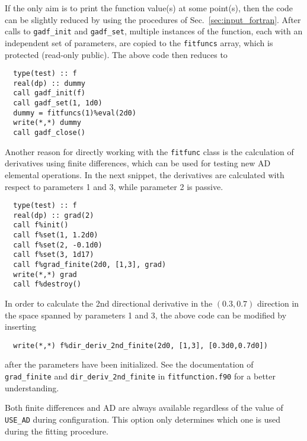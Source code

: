 \documentclass{article}
\begin{document}
If the only aim is to print the function value(s) at some point(s), then the code can be slightly reduced by using the procedures of Sec.~\ref{sec:input_fortran}. After calls to \verb+gadf_init+ and \verb+gadf_set+, multiple instances of the function, each with an independent set of parameters, are copied to the \verb+fitfuncs+ array, which is protected (read-only public). The above code then reduces to
\begin{verbatim}
  type(test) :: f
  real(dp) :: dummy
  call gadf_init(f)
  call gadf_set(1, 1d0)
  dummy = fitfuncs(1)%eval(2d0)
  write(*,*) dummy
  call gadf_close()
\end{verbatim}
Another reason for directly working with the \verb+fitfunc+ class is the calculation of derivatives using finite differences, which can be used for testing new AD elemental operations. In the next snippet, the derivatives are calculated with respect to parameters 1 and 3, while parameter 2 is passive.
\begin{verbatim}
  type(test) :: f
  real(dp) :: grad(2)
  call f%init()
  call f%set(1, 1.2d0)
  call f%set(2, -0.1d0)
  call f%set(3, 1d17)
  call f%grad_finite(2d0, [1,3], grad)
  write(*,*) grad
  call f%destroy()
\end{verbatim}
In order to calculate the 2nd directional derivative in the $(0.3,0.7)$ direction in the space spanned by parameters 1 and 3, the above code can be modified by inserting
\begin{verbatim}
  write(*,*) f%dir_deriv_2nd_finite(2d0, [1,3], [0.3d0,0.7d0])
\end{verbatim}
after the parameters have been initialized. See the documentation of \\
\verb+grad_finite+ and \verb+dir_deriv_2nd_finite+ in \verb+fitfunction.f90+ for a better understanding.

Both finite differences and AD are always available regardless of the value of \verb+USE_AD+ during configuration. This option only determines which one is used during the fitting procedure.
\end{document}
